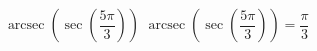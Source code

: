  {$\operatorname{arcsec}\left(\sec\left(\dfrac{5\pi}{3}\right) \right)$}
{ $\operatorname{arcsec}\left(\sec\left(\dfrac{5\pi}{3}\right) \right) = \dfrac{\pi}{3}$}
